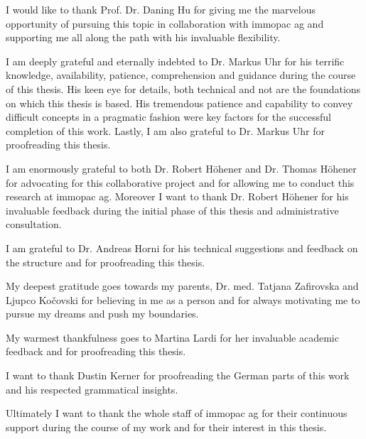 \begin{acknowledgements}

I would like to thank Prof. Dr. Daning Hu for giving me the marvelous opportunity of pursuing this topic in collaboration with immopac ag and supporting me all along the path with his invaluable flexibility.

I am deeply grateful and eternally indebted to Dr. Markus Uhr for his terrific knowledge, availability, patience, comprehension and guidance during the course of this thesis. His keen eye for details, both technical and not are the foundations on which this thesis is based. His tremendous patience and capability to convey difficult concepts in a pragmatic fashion were key factors for the successful completion of this work. Lastly, I am also grateful to Dr. Markus Uhr for proofreading this thesis.

I am enormously grateful to both Dr. Robert H\"ohener and Dr. Thomas H\"ohener for advocating for this collaborative project and for allowing me to conduct this research at immopac ag. Moreover I want to thank Dr. Robert H\"ohener for his invaluable feedback during the initial phase of this thesis and administrative consultation.

I am grateful to Dr. Andreas Horni for his technical suggestions and feedback on the \latex structure and for proofreading this thesis.

My deepest gratitude goes towards my parents, Dr. med. Tatjana Zafirovska and Ljupco Ko\v{c}ovski for believing in me as a person and for always motivating me to pursue my dreams and push my boundaries.

My warmest thankfulness goes to Martina Lardi for her invaluable academic feedback and for proofreading this thesis.

I want to thank Dustin Kerner for proofreading the German parts of this work and his respected grammatical insights.

Ultimately I want to thank the whole staff of immopac ag for their continuous support during the course of my work and for their interest in this thesis.

\end{acknowledgements}